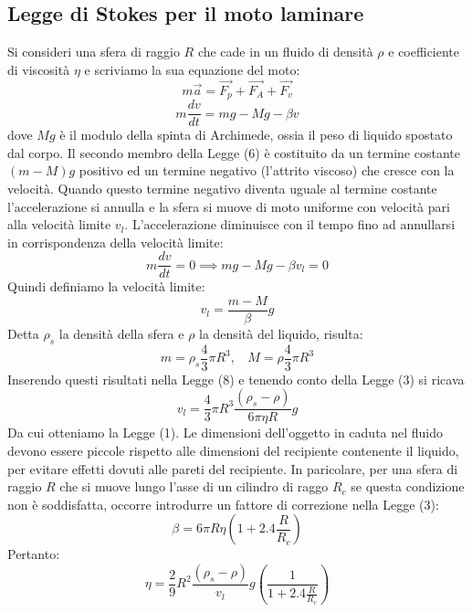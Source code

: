 \documentclass[11pt]{article}
\begin{document}
\subsection{Legge di Stokes per il moto laminare}
Si consideri una sfera di raggio $R$ che cade in un fluido di densità $\rho$ e coefficiente di viscosità $\eta$ e scriviamo la sua equazione del moto:
\begin{equation}
    m\vec{a}=\vec{F_p}+\vec{F_A}+\vec{F_v}
\end{equation}
\begin{equation}
    m\frac{dv}{dt}=mg-Mg-\beta v
\end{equation}
dove $Mg$ è il modulo della spinta di Archimede, ossia il peso di liquido spostato dal corpo. Il secondo membro della Legge (6) è costituito da un termine costante $(m-M)g$ positivo ed un termine negativo (l'attrito viscoso) che cresce con la velocità. Quando questo termine negativo diventa uguale al termine costante l'accelerazione si annulla e la sfera si muove di moto uniforme con velocità pari alla velocità limite $v_l$. L'accelerazione diminuisce con il tempo fino ad annullarsi in corrispondenza della velocità limite:
\begin{equation}
    m\frac{dv}{dt}=0 \implies mg-Mg-\beta v_l=0
\end{equation}
Quindi definiamo la velocità limite:
\begin{equation}
    v_l=\frac{m-M}{\beta}g
\end{equation}
Detta $\rho_s$ la densità della sfera e $\rho$ la densità del liquido, risulta:
\begin{equation}
    m=\rho_s\frac{4}{3}\pi R^3, \ \ \ \ M=\rho\frac{4}{3}\pi R^3
\end{equation}
Inserendo questi risultati nella Legge (8) e tenendo conto della Legge (3) si ricava
\begin{equation}
    v_l=\frac{4}{3}\pi R^3\frac{(\rho_s-\rho)}{6\pi\eta R}g
\end{equation}
Da cui otteniamo la Legge (1). Le dimensioni dell'oggetto in caduta nel fluido devono essere piccole rispetto alle dimensioni del recipiente contenente il liquido, per evitare effetti dovuti alle pareti del recipiente. In paricolare, per una sfera di raggio $R$ che si muove lungo l'asse di un cilindro di raggo $R_c$ se questa condizione non è soddisfatta, occorre introdurre un fattore di correzione nella Legge (3):
\begin{equation}
    \beta=6\pi R\eta\left(1+2.4\frac{R}{R_c}\right)
\end{equation}
Pertanto:
\begin{equation}
    \eta=\frac{2}{9}R^2\frac{(\rho_s-\rho)}{v_l}g\left(\frac{1}{1+2.4\frac{R}{R_c}}\right)
\end{equation}
\end{document}
